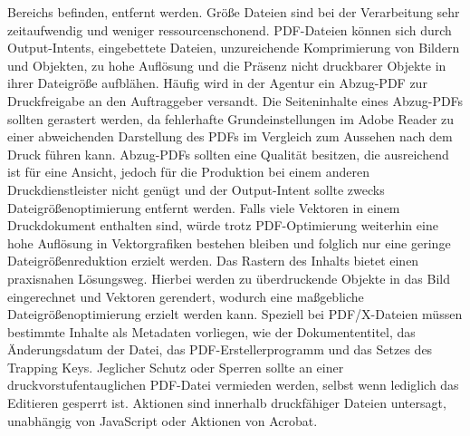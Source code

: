 Bereichs befinden, entfernt werden. Größe Dateien sind bei der Verarbeitung sehr zeitaufwendig und weniger ressourcenschonend. PDF-Dateien können sich durch Output-Intents, eingebettete Dateien, unzureichende Komprimierung von Bildern und Objekten, zu hohe Auflösung und die Präsenz nicht druckbarer Objekte in ihrer Dateigröße aufblähen. Häufig wird in der Agentur ein Abzug-PDF zur Druckfreigabe an den Auftraggeber versandt. Die Seiteninhalte eines Abzug-PDFs sollten gerastert werden, da fehlerhafte Grundeinstellungen im Adobe Reader zu einer abweichenden Darstellung des PDFs im Vergleich zum Aussehen nach dem Druck führen kann. Abzug-PDFs sollten eine Qualität besitzen, die ausreichend ist für eine Ansicht, jedoch für die Produktion bei einem anderen Druckdienstleister nicht genügt und der Output-Intent sollte zwecks Dateigrößenoptimierung entfernt werden. Falls viele Vektoren in einem Druckdokument enthalten sind, würde trotz PDF-Optimierung weiterhin eine hohe Auflösung in Vektorgrafiken bestehen bleiben und folglich nur eine geringe Dateigrößenreduktion erzielt werden. Das Rastern des Inhalts bietet einen praxisnahen Lösungsweg. Hierbei werden zu überdruckende Objekte in das Bild eingerechnet und Vektoren gerendert, wodurch eine maßgebliche Dateigrößenoptimierung erzielt werden kann. Speziell bei PDF/X-Dateien müssen bestimmte Inhalte als Metadaten vorliegen, wie der Dokumententitel, das Änderungsdatum der Datei, das PDF-Erstellerprogramm und das Setzes des Trapping Keys. Jeglicher Schutz oder Sperren sollte an einer druckvorstufentauglichen PDF-Datei vermieden werden, selbst wenn lediglich das Editieren gesperrt ist. Aktionen sind innerhalb druckfähiger Dateien untersagt, unabhängig von JavaScript oder Aktionen von Acrobat. \\
